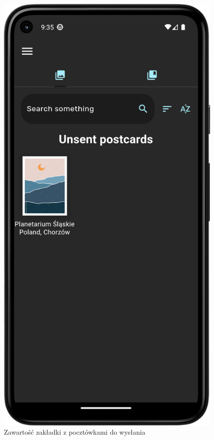 \documentclass[a4paper,twoside,12pt]{book}
\begin{document}
\begin{figure}[H]
\begin{minipage}[b]{0.49\textwidth}
    \includegraphics[width=\textwidth]{mobile_ss/pocztowki.png}
    \caption{Zawartość zakładki z pocztówkami do wysłania}
  \end{minipage}
  \hfill
  \begin{minipage}[b]{0.49\textwidth}

\end{minipage}
\end{figure}
\end{document}
